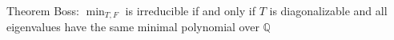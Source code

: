 \documentclass[preview]{standalone}
\begin{document}
\begin{center}
Theorem Boss: $\min_{T, F}$ is irreducible if and only if $T$ is diagonalizable and all eigenvalues have the same minimal polynomial over $\mathbb{Q}$
\end{center}
\end{document}
